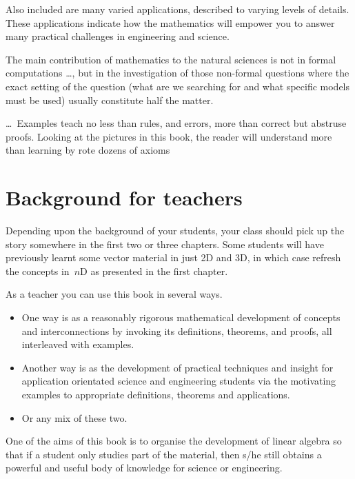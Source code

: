 Also included are many varied applications, described to varying levels of details.
These applications indicate how the mathematics will empower you to answer many practical challenges in engineering and science.


\begin{quoted}{\cite[p.xiii]{Arnold2014}}
The main contribution of mathematics to the natural sciences is not in formal computations \ldots, but in the investigation of those non-formal questions where the exact setting of the question (what are we searching for and what specific models must be used) usually constitute half the matter.

\ldots\
Examples teach no less than rules, and errors, more than correct but abstruse proofs.  
Looking at the pictures in this book, the reader will understand more than learning by rote dozens of axioms
\end{quoted}








\section*{Background for teachers}

Depending upon the background of your students, your class should pick up the story somewhere in the first two or three chapters.
Some students will have previously learnt some vector material in just 2D and 3D,  in which case refresh the concepts in~\(n\)D as presented in the first chapter.

As a teacher you can use this book in several ways.
\begin{itemize}
\item One way is as a reasonably rigorous mathematical development of concepts and interconnections by invoking its definitions, theorems, and proofs, all interleaved with examples.
\item Another way is as the development of practical techniques and insight for application orientated science and engineering students via the motivating examples to appropriate definitions, theorems and applications. 
\item Or any mix of these two.
\end{itemize}

One of the aims of this book is to organise the development of linear algebra so that if a student only studies part of the material, then s/he still obtains a powerful and useful body of knowledge for science or engineering.

